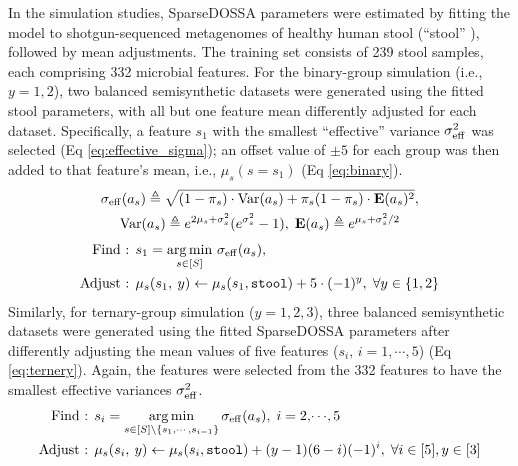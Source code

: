 \documentclass[10pt,letterpaper]{article}
\DeclareMathOperator*{\argmin}{arg\,min}
\newcommand{\1}{{\rm 1}\kern-0.24em{\rm I}}
\newcommand{\Var}{\operatorname{Var}}
\newcommand{\E}{\mathbf{E}}
\begin{document}
In the simulation studies, SparseDOSSA parameters were estimated by fitting the model to shotgun-sequenced metagenomes of healthy human stool (``stool'' \cite{Lloyd17}), followed by mean adjustments. The training set consists of 239 stool samples, each comprising 332 microbial features. For the binary-group simulation (i.e., $y=1,2$), two balanced semisynthetic datasets were generated using the fitted stool parameters, with all but one feature mean differently adjusted for each dataset. Specifically, a feature $s_1$ with the smallest ``effective'' variance $\sigma_{{\rm eff}}^2$ was selected (Eq \ref{eq:effective_sigma}); an offset value of $\pm 5$ for each group was then added to that feature's mean, i.e., $\mu_s(s=s_1)$ (Eq \ref{eq:binary}). 
\begin{equation}
\begin{gathered}
    \sigma_{{\rm eff}}(a_s) \triangleq \sqrt{(1-\pi_s)\cdot\Var(a_s) + \pi_s(1-\pi_s)\cdot\E(a_s)^2}, \\
    \Var(a_s) \triangleq e^{2\mu_s + \sigma_s^2}(e^{\sigma_s^2}-1), \;\E(a_s) \triangleq e^{\mu_s + \sigma_s^2/2}
    \label{eq:effective_sigma}
\end{gathered}
\end{equation}
\begin{equation}
\begin{aligned}
    \text{Find : } &s_1=\argmin_{s\in[S]}\, \sigma_{\rm eff} (a_s), \\
    \text{Adjust : } &\mu_s (s_1,\: y) \leftarrow \mu_s (s_1, \texttt{stool}) + 5\cdot(-1)^y,\;\forall y\in\{1,2\}
    \label{eq:binary}
\end{aligned}
\end{equation}
Similarly, for ternary-group simulation ($y=1,2,3$), three balanced semisynthetic datasets were generated using the fitted SparseDOSSA parameters after differently adjusting the mean values of five features ($s_i,\,i=1,\cdots,5$) (Eq \ref{eq:ternery}). Again, the features were selected from the 332 features to have the smallest effective variances $\sigma_{{\rm eff}}^2$. 
\begin{equation}
\begin{aligned}
    \text{Find : } & s_i=\argmin_{s\in[S]\setminus\{s_1,\cdots ,s_{i-1}\}} \sigma_{\rm eff} (a_s),\; i=2,\!\cdots\!,5 \\
    \text{Adjust : } &\mu_s (s_i,\: y) \leftarrow \mu_s (s_i, \texttt{stool}) + (y-1)(6-i)(-1)^i,\;\forall i\in[5],y\in[3]
    \label{eq:ternery}
\end{aligned}
\end{equation}
\end{document}
